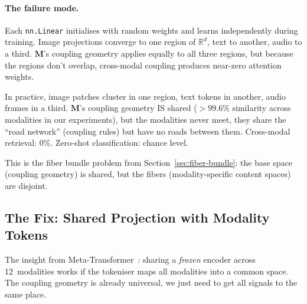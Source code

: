 \documentclass[11pt, a4paper]{article}
\newcommand{\M}{\mathbf{M}}
\newcommand{\R}{\mathbb{R}}
\theoremstyle{remark}
\begin{document}
\paragraph{The failure mode.}
Each \texttt{nn.Linear} initialises with random weights and learns independently during training.
Image projections converge to one region of $\R^d$, text to another, audio to a third.
$\M$'s coupling geometry applies equally to all three regions, but because the regions don't overlap, cross-modal coupling produces near-zero attention weights.

In practice, image patches cluster in one region, text tokens in another, audio frames in a third.
$\M$'s coupling geometry IS shared ($>99.6\%$ similarity across modalities in our experiments), but the modalities never meet, they share the ``road network'' (coupling rules) but have no roads between them.
Cross-modal retrieval: $0\%$.
Zero-shot classification: chance level.

This is the fiber bundle problem from Section~\ref{sec:fiber-bundle}: the base space (coupling geometry) is shared, but the fibers (modality-specific content spaces) are disjoint.

\subsection{The Fix: Shared Projection with Modality Tokens}

The insight from Meta-Transformer~\cite{zhang2023metatransformer}: sharing a \emph{frozen} encoder across 12~modalities works if the tokeniser maps all modalities into a common space.
The coupling geometry is already universal, we just need to get all signals to the same place.
\end{document}
